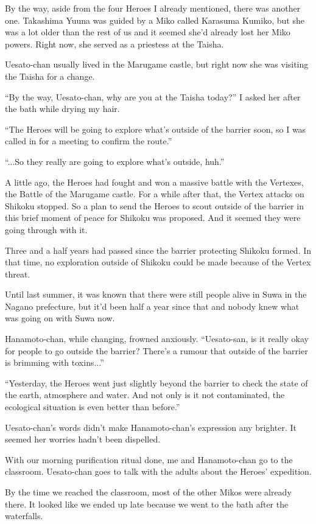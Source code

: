 By the way, aside from the four Heroes I already mentioned, there was another one. Takashima Yuuna was guided by a Miko called Karasuma Kumiko, but she was a lot older than the rest of us and it seemed she'd already lost her Miko powers. Right now, she served as a priestess at the Taisha.

Uesato-chan usually lived in the Marugame castle, but right now she was visiting the Taisha for a change.

``By the way, Uesato-chan, why are you at the Taisha today?'' I asked her after the bath while drying my hair.

``The Heroes will be going to explore what's outside of the barrier soon, so I was called in for a meeting to confirm the route.''

``...So they really are going to explore what's outside, huh.''

A little ago, the Heroes had fought and won a massive battle with the Vertexes, the Battle of the Marugame castle. For a while after that, the Vertex attacks on Shikoku stopped. So a plan to send the Heroes to scout outside of the barrier in this brief moment of peace for Shikoku was proposed. And it seemed they were going through with it.

Three and a half years had passed since the barrier protecting Shikoku formed. In that time, no exploration outside of Shikoku could be made because of the Vertex threat.

Until last summer, it was known that there were still people alive in Suwa in the Nagano prefecture, but it'd been half a year since that and nobody knew what was going on with Suwa now.

Hanamoto-chan, while changing, frowned anxiously.  ``Uesato-san, is it really okay for people to go outside the barrier? There's a rumour that outside of the barrier is brimming with toxins...''

``Yesterday, the Heroes went just slightly beyond the barrier to check the state of the earth, atmosphere and water. And not only is it not contaminated, the ecological situation is even better than before.''

Uesato-chan's words didn't make Hanamoto-chan's expression any brighter. It seemed her worries hadn't been dispelled.

With our morning purification ritual done, me and Hanamoto-chan go to the classroom. Uesato-chan goes to talk with the adults about the Heroes' expedition.

By the time we reached the classroom, most of the other Mikos were already there. It looked like we ended up late because we went to the bath after the waterfalls.

